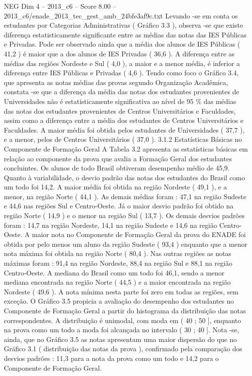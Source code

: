 \begin{textsample}{NEG Dim 4 – 2013\_c6 – Score 8.00 – 2013\_c6/enade\_2013\_tec\_gest\_amb\_24bfe3af9c.txt}
Levando -se em conta os estudantes por Categorias Administrativas ( Gráfico 3.3 ), observa -se que existe diferença estatisticamente significante entre as médias das notas das IES Públicas e Privadas.
Pode ser observado ainda que a média dos alunos de IES Públicas ( 41,2 ) é maior que a dos alunos de IES Privadas ( 36,6 ).
A diferença entre as médias das regiões Nordeste e Sul ( 4,0 ), a maior e a menor média, é inferior a diferença entre IES Públicas e Privadas ( 4,6 ).
Tendo como foco o Gráfico 3.4, que apresenta as notas médias das provas segundo Organização Acadêmica, constata -se que a diferença da média das notas dos estudantes provenientes de Universidades não é estatisticamente significativa ao nível de 95 \% das médias das notas dos estudantes provenientes de Centros Universitários e Faculdades, assim como a diferença entre a média dos estudantes de Centros Universitários e Faculdades.
A maior média foi obtida pelos estudantes de Universidades ( 37,7 ), e a menor, pelos de Centros Universitários ( 37,0 ). 3.1.2 Estatísticas Básicas no Componente de Formação Geral A Tabela 3.2 apresenta as estatísticas básicas em relação ao componente da prova que avalia a Formação Geral dos estudantes concluintes.
Os alunos de todo Brasil obtiveram desempenho médio de 45,9.
Quanto à variabilidade, o desvio padrão das notas dos estudantes do Brasil como um todo foi 14,2.
A maior média foi obtida na região Nordeste ( 49,1 ), e a menor, na região Norte ( 44,1 ).
As demais médias foram : 47,1 na região Sudeste e 44,6 nas regiões Sul e Centro-Oeste.
Já o maior desvio padrão foi obtido na região Norte ( 14,9 ) e o menor na região Sul ( 13,7 ).
Os demais desvios padrões foram : 14,7 na região Nordeste, 14,1 na região Sudeste e 14,6 na região Centro-Oeste.
A maior nota no Componente de Formação Geral da prova do ENADE foi obtida por pelo menos um aluno da região Sudeste ( 93,4 ) enquanto que a menor nota máxima foi obtida na região Norte ( 80,4 ).
Nas outras regiões as notas máximas foram : 91,4 na região Nordeste, 88,4 na região Sul e 88,1 na região Centro-Oeste.
A mediana do Brasil como um todo foi 46,1, sendo a menor mediana encontrada na região Norte ( 44,5 ) e a maior encontrada na região Nordeste ( 49,6 ).
A nota mínima nesta parte foi zero em todas as regiões, sem exceção.
O Gráfico 3.5 propicia a avaliação do desempenho dos estudantes no Componente de Formação Geral a partir do histograma da distribuição das notas correspondentes.
A distribuição é unimodal, com moda em ( 40 ; 50 ], enquanto na prova como um todo a moda foi alcançada no intervalo ( 30 ; 40 ].
Nota -se, ainda, que no Gráfico 3.5 as notas apresentam uma maior dispersão do que no Gráfico 3.1 ( distribuição das notas da prova ), confirmado pela comparação dos desvios padrões : 11,3 para a nota da prova como um todo e 14,2 para o Componente de Formação Geral.

\end{textsample}
